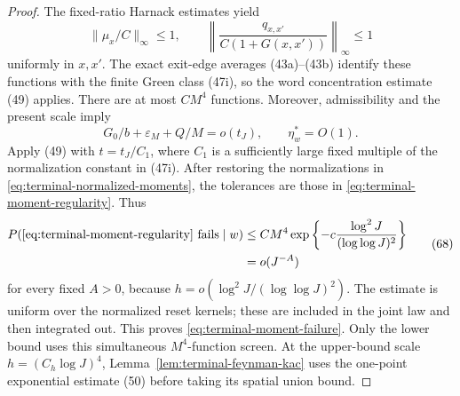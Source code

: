 \begin{proof}
The fixed-ratio Harnack estimates yield
\begin{equation}
 \|\mu_x/C\|_\infty\le1,\qquad
 \left\|\frac{q_{x,x'}}{C(1+G(x,x'))}\right\|_\infty\le1
 \tag{67}\label{eq:terminal-normalized-moments}
\end{equation}
uniformly in $x,x'$.  The exact exit-edge averages (43a)--(43b)
identify these functions with the finite Green class (47i), so the
word concentration estimate (49) applies.  There are at most $CM^4$
functions.  Moreover, admissibility and the present scale imply
\begin{equation}
 G_0/b+\varepsilon_M+Q/M=o(t_J),\qquad \eta_w^*=O(1).
 \tag{67a}\label{eq:terminal-screen-errors}
\end{equation}
Apply (49) with $t=t_J/C_1$, where $C_1$ is a sufficiently large fixed
multiple of the normalization constant in (47i).  After restoring
the normalizations in \eqref{eq:terminal-normalized-moments}, the
tolerances are those in \eqref{eq:terminal-moment-regularity}.  Thus
\begin{equation}
 \begin{split}
 P(\text{\eqref{eq:terminal-moment-regularity} fails}\mid w)
 &\le CM^4\exp\left\{-c\frac{\log^2J}{(\log\log J)^2}\right\}\\
 &=o(J^{-A})
 \end{split}
 \tag{68}\label{eq:terminal-screen-union-bound}
\end{equation}
for every fixed $A>0$, because
$h=o(\log^2J/(\log\log J)^2)$.  The estimate is uniform over the
normalized reset kernels; these are included in the joint law and
then integrated out.  This proves \eqref{eq:terminal-moment-failure}.
Only the lower bound uses this simultaneous $M^4$-function screen.
At the upper-bound scale $h=(C_h\log J)^4$, Lemma~\ref{lem:terminal-feynman-kac}
uses the one-point exponential estimate (50) before taking its
spatial union bound.


\end{proof}
